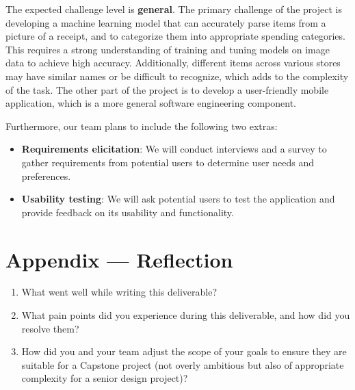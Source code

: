 \documentclass{article}
\begin{document}
The expected challenge level is \textbf{general}. The primary challenge of the
project is developing a machine learning model that can accurately parse items
from a picture of a receipt, and to categorize them into appropriate spending
categories. This requires a strong understanding of training and tuning models
on image data to achieve high accuracy. Additionally, different items across
various stores may have similar names or be difficult to recognize, which adds
to the complexity of the task. The other part of the project is to develop a
user-friendly mobile application, which is a more general software engineering
component.

Furthermore, our team plans to include the following two extras:
\begin{itemize}
    \item \textbf{Requirements elicitation}: We will conduct interviews and a
    survey to gather requirements from potential users to determine user needs
    and preferences.
    \item \textbf{Usability testing}: We will ask potential users to test the
    application and provide feedback on its usability and functionality.

\end{itemize}

\newpage{}

\section*{Appendix --- Reflection}



\begin{enumerate}
    \item What went well while writing this deliverable? 
    \item What pain points did you experience during this deliverable, and how
    did you resolve them?
    \item How did you and your team adjust the scope of your goals to ensure
    they are suitable for a Capstone project (not overly ambitious but also of
    appropriate complexity for a senior design project)?
\end{enumerate}  
\end{document}
